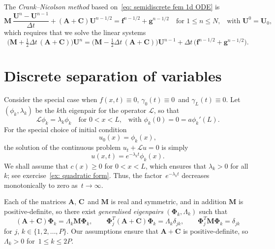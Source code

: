 \begin{example}
The \emph{Crank--Nicolson method} based on~\eqref{eq: semidiscrete fem 1d ODE} 
is
\[
\boldsymbol{M}\,\frac{\boldsymbol{U}^{n}-\boldsymbol{U}^{n-1}}{\Delta t}
+(\boldsymbol{A}+\boldsymbol{C})\boldsymbol{U}^{n-1/2}=\boldsymbol{f}^{n-1/2}
    +\boldsymbol{g}^{n-1/2}\quad\text{for $1\le n\le N$,}
    \quad\text{with $\boldsymbol{U}^0=\boldsymbol{U}_0$,}
\]
which requires that we solve the linear systems
\[
\bigl(\boldsymbol{M}+\tfrac12\Delta t\,(\boldsymbol{A}+\boldsymbol{C})\bigr) 
    \boldsymbol{U}^n
=\bigl(\boldsymbol{M}-\tfrac12\Delta t\,(\boldsymbol{A}+\boldsymbol{C})\bigr) 
    \boldsymbol{U}^{n-1}
    +\Delta t\,\bigl(\boldsymbol{f}^{n-1/2}+\boldsymbol{g}^{n-1/2}\bigr).
\]
\end{example}

\section{Discrete separation of variables}\label{sec: discrete separation}
Consider the special case when $f(x,t)\equiv0$, $\gamma_0(t)\equiv0$~and 
$\gamma_L(t)\equiv0$.  Let $(\phi_k,\lambda_k)$ be the $k$th eigenpair for the 
operator $\mathcal{L}$, so that
\[
\mathcal{L}\phi_k=\lambda_k\phi_k\quad\text{for $0<x<L$,}\quad
\text{with $\phi_k(0)=0=a\phi_k'(L)$.}
\]
For the special choice of initial condition
\[
u_0(x)=\phi_k(x),
\]
the solution of the continuous problem $u_t+\mathcal{L}u=0$ is simply
\begin{equation}\label{eq: u0 eigenfunction}
u(x,t)=e^{-\lambda_kt}\phi_k(x).
\end{equation}
We shall assume that $c(x)\ge0$ for $0<x<L$, which ensures that $\lambda_k>0$ 
for all~$k$; see exercise~\ref{ex: quadratic form}.  Thus, the 
factor~$e^{-\lambda_kt}$ decreases monotonically to zero as~$t\to\infty$.

Each of the matrices $\boldsymbol{A}$, $\boldsymbol{C}$~and $\boldsymbol{M}$ is 
real and symmetric, and in addition $\boldsymbol{M}$ is positive-definite, so 
there exist \emph{generalised eigenpairs} $(\boldsymbol{\Phi}_k,\Lambda_k)$ 
such that 
\[
(\boldsymbol{A}+\boldsymbol{C})\boldsymbol{\Phi}_k
    =\Lambda_k\boldsymbol{M}\boldsymbol{\Phi}_k,\qquad
\boldsymbol{\Phi}_j^T(\boldsymbol{A}+\boldsymbol{C})\boldsymbol{\Phi}_k
    =\Lambda_k\delta_{jk},\qquad
\boldsymbol{\Phi}_j^T\boldsymbol{M}\boldsymbol{\Phi}_k=\delta_{jk}
\]
for $j$, $k\in\{1,2,\ldots,P\}$.  Our assumptions ensure that 
$\boldsymbol{A}+\boldsymbol{C}$ is positive-definite, so $\Lambda_k>0$ 
for~$1\le k\le2P$.

